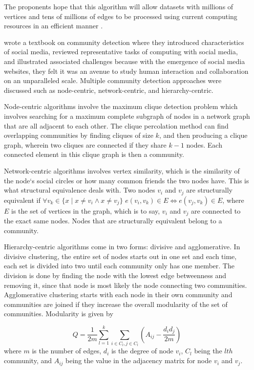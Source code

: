 The proponents hope that this algorithm will allow datasets with millions of vertices and tens of millions of edges to be processed using current computing resources in an efficient manner \cite{Clauset:2004}.

 wrote a textbook on community detection where they introduced characteristics of social media, reviewed representative tasks of computing with social media, and illustrated associated challenges because with the emergence of social media websites, they felt it was an avenue to study human interaction and collaboration on an unparalleled scale. Multiple community detection approaches were discussed such as node-centric, network-centric, and hierarchy-centric. 

Node-centric algorithms involve the maximum clique detection problem which involves searching for a maximum complete subgraph of nodes in a network graph that are all adjacent to each other. The clique percolation method can find overlapping communities by finding cliques of size $k$, and then producing a clique graph, wherein two cliques are connected if they share $k-1$ nodes. Each connected element in this clique graph is then a community.

Network-centric algorithms involves vertex similarity, which is the similarity of the node`s social circles or how many common friends the two nodes have. This is what structural equivalence deals with. Two nodes $v_i$ and $v_j$ are structurally equivalent if $\forall v_k \in \{x \mid x \neq v_i \wedge x \neq v_j \}$ $e(v_i,v_k) \in E \iff e(v_j,v_k) \in E$, where $E$ is the set of vertices in the graph, which is to say, $v_i$ and $v_j$ are connected to the exact same nodes. Nodes that are structurally equivalent belong to a community. 

Hierarchy-centric algorithms come in two forms: divisive and agglomerative. In divisive clustering, the entire set of nodes starts out in one set and each time, each set is divided into two until each community only has one member. The division is done by finding the node with the lowest edge betweenness and removing it, since that node is most likely the node connecting two communities. Agglomerative clustering starts with each node in their own community and communities are joined if they increase the overall modularity of the set of communities. Modularity is given by

\begin{equation}
	Q = \frac{1}{2m} \sum_{l = 1}^{k} \sum_{i \in C_l, j \in C_l} (A_{ij} - \frac{d_i d_j}{2m})
\end{equation}where $m$ is the number of edges, $d_i$ is the degree of node $v_i$, $C_l$ being the $lth$ community, and $A_{ij}$ being the value in the adjacency matrix for node $v_i$ and $v_j$.

